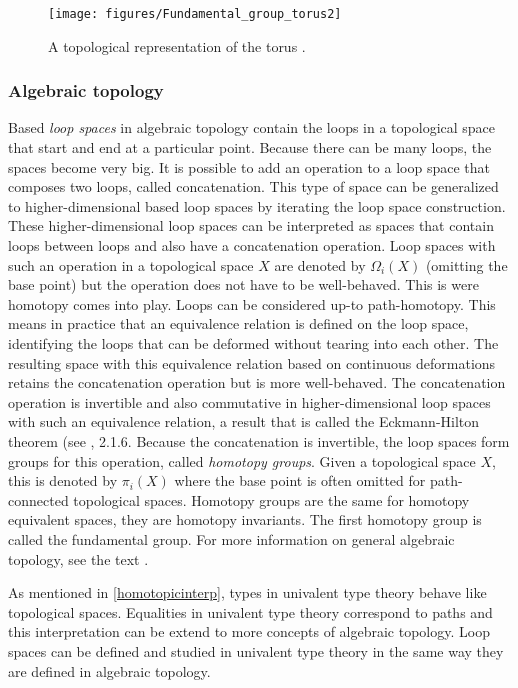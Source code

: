 \documentclass[12pt,a4paper,twoside,xetex]{book} %
\newcommand{\keyword}[1]{\emph{#1}\index{#1}}
\begin{document}
\begin{figure}
\centering
\texttt{[image: figures/Fundamental\_group\_torus2]}
\caption{A topological representation of the torus \cite{Dinkelbach2005}. 
\label{torus}}
\end{figure}

\subsubsection{Algebraic topology}\label{higherhomotopy}

Based \keyword{loop spaces} in algebraic topology contain the loops in a topological space that start and end at a particular point. Because there can be many loops, the spaces become very big. It is possible to add an operation to a loop space that composes two loops, called concatenation. This type of space can be generalized to higher-dimensional based loop spaces by iterating the loop space construction. These higher-dimensional loop spaces can be interpreted as spaces that contain loops between loops and also have a concatenation operation. Loop spaces with such an operation in a topological space $X$ are denoted by $\Omega_i (X)$ (omitting the base point) but the operation does not have to be well-behaved. This is were homotopy comes into play. Loops can be considered up-to path-homotopy. This means in practice that an equivalence relation is defined on the loop space, identifying the loops that can be deformed without tearing into each other. The resulting space with this equivalence relation based on continuous deformations retains the concatenation operation but is more well-behaved. The concatenation operation is invertible and also commutative in higher-dimensional loop spaces with such an equivalence relation, a result that is called the Eckmann-Hilton theorem (see \cite{Voevodsky2013}, 2.1.6. Because the concatenation is invertible, the loop spaces form groups for this operation, called \keyword{homotopy groups}. Given a topological space $X$, this is denoted by $\pi_i(X)$ where the base point is often omitted for path-connected topological spaces. Homotopy groups are the same for homotopy equivalent spaces, they are homotopy invariants. The first homotopy group is called the fundamental group. For more information on general 
algebraic topology, see the text \cite{Hatcher2001}.


As mentioned in \cref{homotopicinterp}, types in univalent type theory behave like topological spaces. Equalities in univalent type theory correspond to paths and this interpretation can be extend to more concepts of algebraic topology. Loop spaces can be defined and studied in univalent type theory in the same way they are defined in algebraic topology. 
\end{document}

